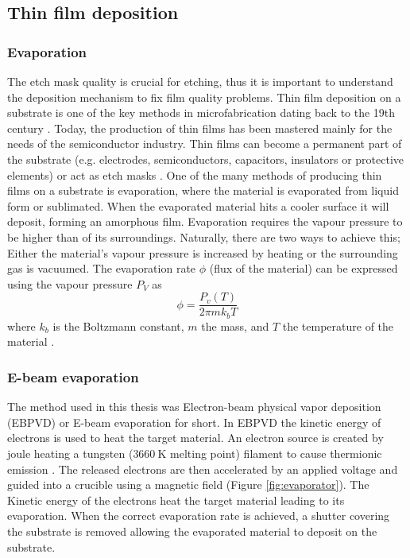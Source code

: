 \documentclass[final]{jyflluk}
\begin{document}
\subsection{Thin film deposition}
\label{sec:xx2}


\subsubsection{Evaporation}

The etch mask quality is crucial for etching, thus it is important to understand the deposition mechanism to fix film quality problems. Thin film deposition on a substrate is one of the key methods in microfabrication dating back to the 19th century \cite{ohring1992materials}.  Today, the production of thin films has been mastered mainly for the needs of the semiconductor industry. Thin films can become a permanent part of the substrate (e.g. electrodes, semiconductors, capacitors, insulators or protective elements) or act as etch masks \cite{franssila2010introduction}. One of the many methods of producing thin films on a substrate is evaporation, where the material is evaporated from liquid form or sublimated. When the evaporated material hits a cooler surface it will deposit, forming an amorphous film. Evaporation requires the vapour pressure to be higher than of its surroundings. Naturally, there are two ways to achieve this; Either the material’s vapour pressure is increased by heating or the surrounding gas is vacuumed. The evaporation rate $\phi$ (flux of the material) can be expressed using the vapour pressure $P_V$ as 
%
\begin{equation}
    \label{eq:fluxx}
    \phi = \frac{P_v (T)}{2 \pi m k_b T}
 \end{equation}
where $k_b$ is the Boltzmann constant, $m$ the mass, and $T$ the temperature of the material \cite{franssila2010introduction}.

\subsubsection{E-beam evaporation}

The method used in this thesis was Electron-beam physical vapor deposition (EBPVD) or E-beam evaporation for short. In EBPVD the kinetic energy of electrons is used to heat the target material. An electron source is created by joule heating a tungsten ($\SI{3660}{\kelvin}$ melting point) filament to cause thermionic emission \cite{franssila2010introduction}. The released electrons are then accelerated by an applied voltage and guided into a crucible using a magnetic field (Figure \ref{fig:evaporator}). The Kinetic energy of the electrons heat the target material leading to its evaporation. When the correct evaporation rate is achieved, a shutter covering the substrate is removed allowing the evaporated material to deposit on the substrate.
\end{document}
